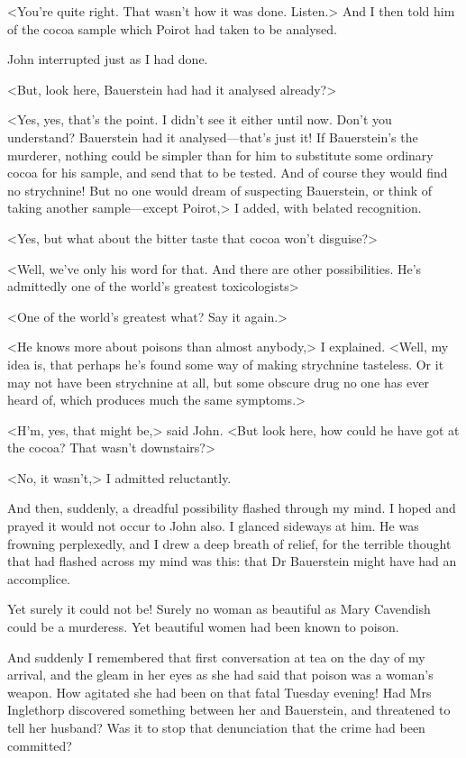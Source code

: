  <You're quite right. That wasn't how it was done. Listen.> And I then told him of the cocoa sample which Poirot had taken to be analysed. 

 John interrupted just as I had done. 

 <But, look here, Bauerstein had had it analysed already?> 

 <Yes, yes, that's the point. I didn't see it either until now. Don't you understand? Bauerstein had it analysed—that's just it! If Bauerstein's the murderer, nothing could be simpler than for him to substitute some ordinary cocoa for his sample, and send that to be tested. And of course they would find no strychnine! But no one would dream of suspecting Bauerstein, or think of taking another sample—except Poirot,> I added, with belated recognition. 

 <Yes, but what about the bitter taste that cocoa won't disguise?> 

 <Well, we've only his word for that. And there are other possibilities. He's admittedly one of the world's greatest toxicologists\longdash> 

 <One of the world's greatest what? Say it again.> 

 <He knows more about poisons than almost anybody,> I explained. <Well, my idea is, that perhaps he's found some way of making strychnine tasteless. Or it may not have been strychnine at all, but some obscure drug no one has ever heard of, which produces much the same symptoms.> 

 <H'm, yes, that might be,> said John. <But look here, how could he have got at the cocoa? That wasn't downstairs?> 

 <No, it wasn't,> I admitted reluctantly. 

 And then, suddenly, a dreadful possibility flashed through my mind. I hoped and prayed it would not occur to John also. I glanced sideways at him. He was frowning perplexedly, and I drew a deep breath of relief, for the terrible thought that had flashed across my mind was this: that Dr Bauerstein might have had an accomplice. 

 Yet surely it could not be! Surely no woman as beautiful as Mary Cavendish could be a murderess. Yet beautiful women had been known to poison. 

 And suddenly I remembered that first conversation at tea on the day of my arrival, and the gleam in her eyes as she had said that poison was a woman's weapon. How agitated she had been on that fatal Tuesday evening! Had Mrs Inglethorp discovered something between her and Bauerstein, and threatened to tell her husband? Was it to stop that denunciation that the crime had been committed? 

